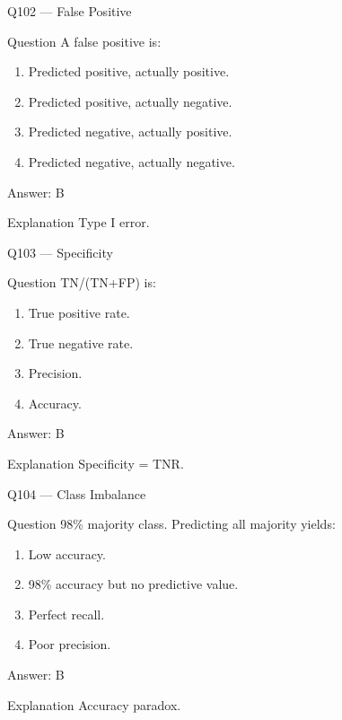 \documentclass[aspectratio=169,8pt]{beamer}
\begin{document}
	\begin{frame}{Q102 --- False Positive}
		\begin{block}{Question}
			A false positive is:
		\end{block}
		\begin{enumerate}
			\item Predicted positive, actually positive.
			\item Predicted positive, actually negative.
			\item Predicted negative, actually positive.
			\item Predicted negative, actually negative.
		\end{enumerate}
		\begin{exampleblock}{Answer: B}\end{exampleblock}
		\begin{block}{Explanation}
			Type I error.
		\end{block}
	\end{frame}
	
	\begin{frame}{Q103 --- Specificity}
		\begin{block}{Question}
			TN/(TN+FP) is:
		\end{block}
		\begin{enumerate}
			\item True positive rate.
			\item True negative rate.
			\item Precision.
			\item Accuracy.
		\end{enumerate}
		\begin{exampleblock}{Answer: B}\end{exampleblock}
		\begin{block}{Explanation}
			Specificity = TNR.
		\end{block}
	\end{frame}
	
	\begin{frame}{Q104 --- Class Imbalance}
		\begin{block}{Question}
			98\% majority class. Predicting all majority yields:
		\end{block}
		\begin{enumerate}
			\item Low accuracy.
			\item 98\% accuracy but no predictive value.
			\item Perfect recall.
			\item Poor precision.
		\end{enumerate}
		\begin{exampleblock}{Answer: B}\end{exampleblock}
		\begin{block}{Explanation}
			Accuracy paradox.
		\end{block}
	\end{frame}
	
\end{document}
